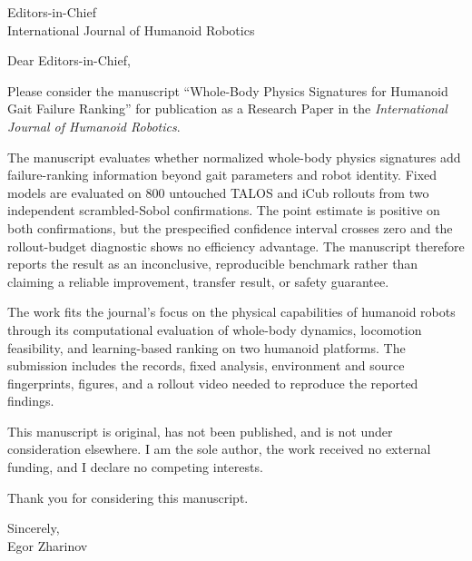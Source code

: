 \documentclass[11pt]{letter}
\date{July 28, 2026}
\begin{document}
\begin{letter}{Editors-in-Chief\\
International Journal of Humanoid Robotics}
\opening{Dear Editors-in-Chief,}

Please consider the manuscript ``Whole-Body Physics Signatures for Humanoid
Gait Failure Ranking'' for publication as a Research Paper in the
\emph{International Journal of Humanoid Robotics}.

The manuscript evaluates whether normalized whole-body physics signatures add
failure-ranking information beyond gait parameters and robot identity. Fixed
models are evaluated on 800 untouched TALOS and iCub rollouts from two
independent scrambled-Sobol confirmations. The point estimate is positive on
both confirmations, but the prespecified confidence interval crosses zero and
the rollout-budget diagnostic shows no efficiency advantage. The manuscript
therefore reports the result as an inconclusive, reproducible benchmark rather
than claiming a reliable improvement, transfer result, or safety guarantee.

The work fits the journal's focus on the physical capabilities of humanoid
robots through its computational evaluation of whole-body dynamics, locomotion
feasibility, and learning-based ranking on two humanoid platforms. The
submission includes the records, fixed analysis, environment and source
fingerprints, figures, and a rollout video needed to reproduce the reported
findings.

This manuscript is original, has not been published, and is not under
consideration elsewhere. I am the sole author, the work received no external
funding, and I declare no competing interests.

Thank you for considering this manuscript.

\noindent Sincerely,\\[1.5em]
Egor Zharinov
\end{letter}
\end{document}
